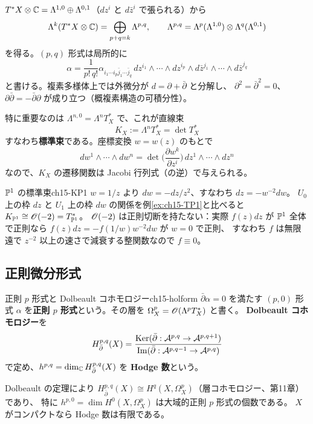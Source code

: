 $T^*X\otimes\mathbb{C} = \Lambda^{1,0}\oplus\Lambda^{0,1}$（$dz^i$ と $d\bar z^{i}$ で張られる）から
\[
\Lambda^k(T^*X\otimes\mathbb{C}) = \bigoplus_{p+q=k}\Lambda^{p,q},\qquad
\Lambda^{p,q} = \Lambda^p(\Lambda^{1,0})\otimes\Lambda^q(\Lambda^{0,1})
\]
を得る。$(p,q)$ 形式は局所的に
\[
\alpha = \frac{1}{p!\,q!}\alpha_{i_1\cdots i_p\bar j_1\cdots\bar j_q}\,dz^{i_1}\wedge\cdots\wedge dz^{i_p}\wedge d\bar z^{j_1}\wedge\cdots\wedge d\bar z^{j_q}
\]
と書ける。複素多様体上では外微分が $d = \partial + \bar\partial$ と分解し、
$\partial^2 = \bar\partial^2 = 0$、$\partial\bar\partial = -\bar\partial\partial$ が成り立つ（概複素構造の可積分性）。

特に重要なのは $\Lambda^{n,0} = \Lambda^n T^*_X$ で、これが直線束
\[
K_X := \Lambda^n T^*_X = \det T^*_X
\]
すなわち\textbf{標準束}である。座標変換 $w=w(z)$ のもとで
\[
dw^1\wedge\cdots\wedge dw^n = \det\Big(\frac{\partial w^k}{\partial z^i}\Big)\,dz^1\wedge\cdots\wedge dz^n
\]
なので、$K_X$ の遷移関数は Jacobi 行列式（の逆）で与えられる。

\begin{myex}{$\mathbb{P}^1$ の標準束}{ch15-KP1}
$w=1/z$ より $dw = -dz/z^2$、すなわち $dz = -w^{-2}dw$。
$U_0$ 上の枠 $dz$ と $U_1$ 上の枠 $dw$ の関係を例\ref{ex:ch15-TP1}と比べると $K_{\mathbb{P}^1}\cong\mathscr{O}(-2) = T_{\mathbb{P}^1}^*$。
$\mathscr{O}(-2)$ は正則切断を持たない：実際 $f(z)dz$ が $\mathbb{P}^1$ 全体で正則なら $f(z)dz = -f(1/w)w^{-2}dw$ が $w=0$ で正則、
すなわち $f$ は無限遠で $z^{-2}$ 以上の速さで減衰する整関数なので $f\equiv 0$。
\end{myex}

\subsection{正則微分形式}

\begin{mydef}{正則 $p$ 形式と Dolbeault コホモロジー}{ch15-holform}
$\bar\partial\alpha = 0$ を満たす $(p,0)$ 形式 $\alpha$ を\textbf{正則 $p$ 形式}という。その層を $\Omega^p_X = \mathscr{O}(\Lambda^pT^*_X)$ と書く。
\textbf{Dolbeault コホモロジー}を
\[
H^{p,q}_{\bar\partial}(X) = \frac{\operatorname{Ker}(\bar\partial : \mathcal A^{p,q}\to\mathcal A^{p,q+1})}{\operatorname{Im}(\bar\partial:\mathcal A^{p,q-1}\to\mathcal A^{p,q})}
\]
で定め、$h^{p,q} = \dim_{\mathbb{C}} H^{p,q}_{\bar\partial}(X)$ を \textbf{Hodge 数}という。
\end{mydef}

Dolbeault の定理により $H^{p,q}_{\bar\partial}(X)\cong H^q(X,\Omega^p_X)$（層コホモロジー、第11章）であり、
特に $h^{p,0} = \dim H^0(X,\Omega^p_X)$ は大域的正則 $p$ 形式の個数である。
$X$ がコンパクトなら Hodge 数は有限である。


